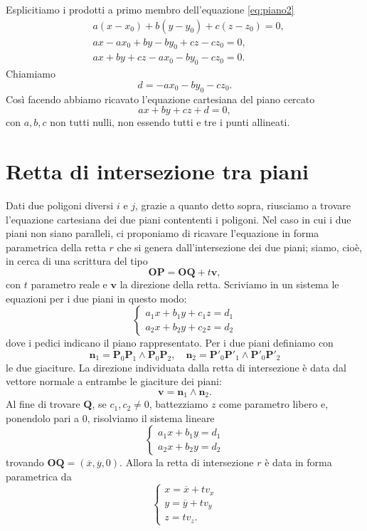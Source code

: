 \documentclass[a4paper]{article}
\newcommand{\B}{\mathbf}
\begin{document}
Esplicitiamo i prodotti a primo membro dell'equazione \eqref{eq:piano2} 
\[
\begin{aligned}
& a\left(x-x_0\right)+b\left(y-y_0\right)+c\left(z-z_0\right)=0, \\
& a x-a x_0+b y-b y_0+c z-c z_0=0, \\
& a x+b y+c z-a x_0-b y_0-c z_0=0.
\end{aligned}
\]
Chiamiamo
$$
d=-a x_0-b y_0-c z_0.
$$ 
Così facendo abbiamo ricavato l'equazione cartesiana del piano cercato 
$$
ax+by+cz+d=0,
$$ 
con $a,b,c$ non tutti nulli, non essendo tutti e tre i punti allineati.

\section{Retta di intersezione tra piani}
Dati due poligoni diversi $i$ e $j$, grazie a quanto detto sopra, riusciamo a trovare l'equazione cartesiana dei due piani contententi i poligoni. Nel caso in cui i due piani non siano paralleli, ci proponiamo di ricavare l'equazione in forma parametrica della retta $r$ che si genera dall'intersezione dei due piani; siamo, cioè, in cerca di una scrittura del tipo $$\B{OP}=\B{OQ}+t\B{v},$$ con $t$ parametro reale e $\B{v}$ la direzione della retta. Scriviamo in un sistema le equazioni per i due piani in questo modo: 
$$
\begin{cases}
a_1x+b_1y+c_1z=d_1\\ 
a_2x+b_2y+c_2z=d_2
\end{cases}
$$ 
dove i pedici indicano il piano rappresentato. Per i due piani definiamo con 
$$
\B{n}_1=\B{P}_0\B{P}_1\wedge \B{P}_0\B{P}_2,\quad \B{n}_2 = \B{P}'_0\B{P}'_1\wedge \B{P}'_0\B{P}'_2
$$ 
le due giaciture. La direzione individuata dalla retta di intersezione è data dal vettore normale a entrambe le giaciture dei piani: 
$$
\B{v}=\B{n}_1\wedge \B{n}_2.
$$ 
Al fine di trovare $\B{Q}$, se $c_1,c_2\neq 0$, battezziamo $z$ come parametro libero e, ponendolo pari a $0$, risolviamo il sistema lineare 
$$
\begin{cases}
a_1x+b_1y=d_1\\ 
a_2x+b_2y=d_2
\end{cases}
$$ 
trovando $\B{OQ}=(\overline{x},\overline{y},0)$. Allora la retta di intersezione $r$ è data in forma parametrica da 
$$
\begin{cases}
x=\overline{x}+tv_x \\ 
y=\overline{y}+tv_y \\ 
z=tv_z.
\end{cases}
$$
\end{document}
